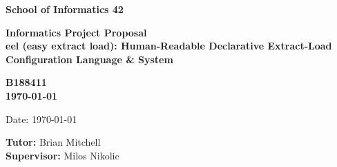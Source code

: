 \documentclass[a4paper,11pt]{article}
\newcommand{\examnumber}{B188411}
\newcommand{\field}{eel (easy extract load): Human-Readable Declarative Extract-Load Configuration Language \& System}
\newcommand{\tutor}{Brian Mitchell}
\newcommand{\supervisor}{Milos Nikolic}
\begin{document}
\begin{minipage}[b]{110mm}
  {\Huge\bf School of Informatics 42
    \vspace*{17mm}}
\end{minipage}
\hfill
\begin{minipage}[t]{40mm}
\end{minipage}
\par\noindent
\vspace*{2cm}
\begin{center}
  \Large\bf Informatics Project Proposal \\
  \Large\bf \field
\end{center}
\vspace*{1.5cm}
\begin{center}
  \bf \examnumber\\
  \monthyeardate\today
\end{center}
\vspace*{5mm}

%
%                       
\begin{abstract}
  
\end{abstract}

\vspace*{1cm}

\vspace*{3cm}
Date: \today

\vfill
{\bf Tutor:} \tutor\\
{\bf Supervisor:} \supervisor
\newpage

\setcounter{page}{1}                            %
\footruleheight{1pt}
\headruleheight{1pt}
\rhead{- \thepage}
\cfoot{}
%

\tableofcontents
\pagebreak




{\small
}
\end{document}
